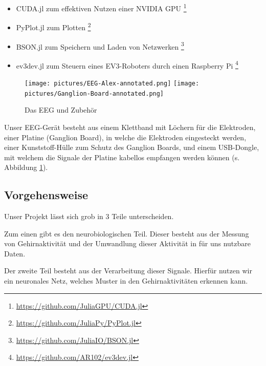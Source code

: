 \documentclass{scrartcl}
\begin{document}
\begin{itemize}
\begin{itemize}
			\item CUDA.jl zum effektiven Nutzen einer NVIDIA GPU
				\footnote{\href{https://github.com/JuliaGPU/CUDA.jl}{https://github.com/JuliaGPU/CUDA.jl}}
				\cite{CUDA}
			
			\item PyPlot.jl zum Plotten
				\footnote{\href{https://github.com/JuliaPy/PyPlot.jl}{https://github.com/JuliaPy/PyPlot.jl}}
				\cite{pyplot}
			
			\item BSON.jl zum Speichern und Laden von Netzwerken
				\footnote{\href{https://github.com/JuliaIO/BSON.jl}{https://github.com/JuliaIO/BSON.jl}}
			
			\item ev3dev.jl zum Steuern eines EV3-Roboters durch einen Raspberry Pi
				\footnote{\href{https://github.com/AR102/ev3dev.jl}{https://github.com/AR102/ev3dev.jl}}
				\cite{ev3dev}
			
		\end{itemize}

	\end{itemize}

	\begin{figure}[h!]
		\texttt{[image: pictures/EEG-Alex-annotated.png]}
		\texttt{[image: pictures/Ganglion-Board-annotated.png]}
		\caption{Das EEG und Zubehör}
		\label{EEG-Zubehor}
	\end{figure}

	Unser EEG-Gerät besteht aus einem Klettband mit Löchern für die Elektroden, einer Platine (Ganglion Board), in welche die Elektroden eingesteckt werden, einer Kunststoff-Hülle zum Schutz des Ganglion Boards, und einem USB-Dongle, mit welchem die Signale der Platine kabellos empfangen werden können (s. Abbildung \ref{EEG-Zubehor}).

	\subsection{Vorgehensweise}

	Unser Projekt lässt sich grob in 3 Teile unterscheiden.

	Zum einen gibt es den neurobiologischen Teil. Dieser besteht aus der Messung von Gehirnaktivität und der Umwandlung dieser Aktivität in für uns nutzbare Daten.
	
	Der zweite Teil besteht aus der Verarbeitung dieser Signale. Hierfür nutzen wir ein neuronales Netz, welches Muster in den Gehirnaktivitäten erkennen kann.
	
\end{document}
